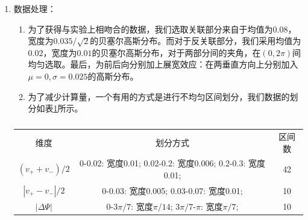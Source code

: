 \documentclass[aps,pre,12pt,preprint,onecolumn,showpacs,showkeys]{revtex4-1}
\begin{document}
\begin{enumerate}
\begin{enumerate}
    \end{enumerate}
    \item 数据处理：
    \begin{enumerate}
        \item 为了获得与实验上相吻合的数据，我们选取关联部分来自于均值为$0.08$，宽度为$0.035/\sqrt{2}$的贝塞尔高斯分布。而对于反关联部分，我们采用均值为$0.02$，宽度为$0.01$的贝塞尔高斯分布，对于两部分间的夹角，在$(0,2\pi)$间均匀选取。最后，为前后向分别加上展宽效应：在两垂直方向上分别加入$\mu=0,\sigma=0.025$的高斯分布。
        \item 为了减少计算量，一个有用的方式是进行不均匀区间划分，我们数据的划分如表\ref{tab:bu1}所示。
    \end{enumerate}
    \begin{table}[htbp]
    \caption{\label{tab:bu1}}
    \begin{ruledtabular}
    \begin{tabular}{c|c|c}
    维度&划分方式&区间数\\
    \colrule
    $(v_++v_-)/2$&0-0.02: 宽度0.01;
    0.02-0.2: 宽度0.006;
    0.2-0.3: 宽度0.01;
    &42\\
    $|v_+-v_-|/2$&0-0.03: 宽度0.005;
    0.03-0.07: 宽度0.01;&10\\
    $|\Delta\Psi|$&0-$3\pi/7$: 宽度$\pi/14$;
    $3\pi/7$-$\pi$: 宽度$\pi/7$;&10    
    \end{tabular}
    \end{ruledtabular}
    \end{table}
\end{enumerate}
\end{document}
